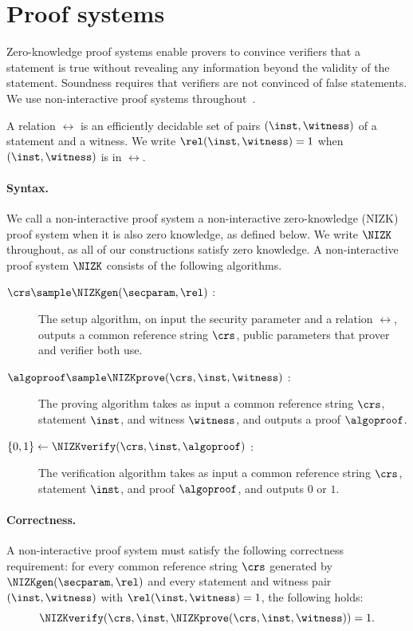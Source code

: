 \section{Proof systems}\label{sec:prelims-nizks}

Zero-knowledge proof systems enable provers to convince verifiers that a
statement is true without revealing any information beyond the validity of the
statement. Soundness requires that verifiers are not convinced of false
statements. We use non-interactive proof systems throughout~\cite{STOC:BluFelMic88}.

A relation $\rel$ is an efficiently decidable set of pairs $(\inst, \witness)$
of a statement and a witness. We write $\rel(\inst, \witness) = 1$ when
$(\inst, \witness)$ is in $\rel$.

\paragraph{Syntax.} We call a non-interactive proof system a non-interactive
zero-knowledge (NIZK) proof system when it is also zero knowledge, as defined
below. We write $\NIZK$ throughout, as all of our constructions satisfy zero
knowledge. A non-interactive proof system $\NIZK$ consists of the following
algorithms.

\begin{description}

  \item[$\crs \sample \NIZKgen(\secparam, \rel)$ :] The setup algorithm, on
input the security parameter and a relation $\rel$, outputs a common
reference string $\crs$, public parameters that prover and verifier both use.

  \item[$\algoproof \sample \NIZKprove(\crs, \inst, \witness)$ :] The proving
algorithm takes as input a common reference string $\crs$, statement $\inst$,
and witness $\witness$, and outputs a proof $\algoproof$.

  \item[$\{0, 1\} \leftarrow \NIZKverify(\crs, \inst, \algoproof)$ :] The
verification algorithm takes as input a common reference string $\crs$,
statement $\inst$, and proof $\algoproof$, and outputs $0$ or $1$.

\end{description}

\paragraph{Correctness.} A non-interactive proof system must satisfy the
following correctness requirement: for every common reference string
$\crs$ generated by $\NIZKgen(\secparam, \rel)$ and every statement and witness
pair
$(\inst, \witness)$ with $\rel(\inst, \witness) = 1$, the following holds:
%
\begin{equation*}
%
  \NIZKverify(\crs, \inst, \NIZKprove(\crs, \inst, \witness)) = 1.
%
\end{equation*}
%

